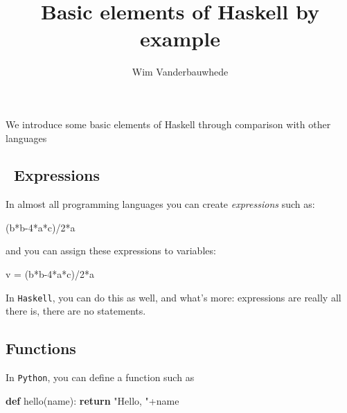 \documentclass[11pt]{amsart}
\title{Basic elements of Haskell by example }
\author{Wim Vanderbauwhede}
\newenvironment{Shaded}{}{}
\newcommand{\KeywordTok}[1]{\textcolor[rgb]{0.00,0.44,0.13}{\textbf{{#1}}}}
\newcommand{\DecValTok}[1]{\textcolor[rgb]{0.25,0.63,0.44}{{#1}}}
\newcommand{\StringTok}[1]{\textcolor[rgb]{0.25,0.44,0.63}{{#1}}}
\newcommand{\FunctionTok}[1]{\textcolor[rgb]{0.02,0.16,0.49}{{#1}}}
\newcommand{\NormalTok}[1]{{#1}}
\begin{document}
\maketitle

We introduce some basic elements of Haskell through comparison with
other languages

\subsection{~Expressions}\label{expressions}

In almost all programming languages you can create \emph{expressions}
such as:

\begin{Shaded}
\begin{Highlighting}[]
    \NormalTok{(b}\FunctionTok{*}\NormalTok{b}\FunctionTok{-}\DecValTok{4}\FunctionTok{*}\NormalTok{a}\FunctionTok{*}\NormalTok{c)}\FunctionTok{/}\DecValTok{2}\FunctionTok{*}\NormalTok{a}
\end{Highlighting}
\end{Shaded}

and you can assign these expressions to variables:

\begin{Shaded}
\begin{Highlighting}[]
    \NormalTok{v }\FunctionTok{=} \NormalTok{(b}\FunctionTok{*}\NormalTok{b}\FunctionTok{-}\DecValTok{4}\FunctionTok{*}\NormalTok{a}\FunctionTok{*}\NormalTok{c)}\FunctionTok{/}\DecValTok{2}\FunctionTok{*}\NormalTok{a}
\end{Highlighting}
\end{Shaded}

In \texttt{Haskell}, you can do this as well, and what's more:
expressions are really all there is, there are no statements.

\subsection{Functions}\label{functions}

In \texttt{Python}, you can define a function such as

\begin{Shaded}
\begin{Highlighting}[]
    \KeywordTok{def} \NormalTok{hello(name):}
        \KeywordTok{return} \StringTok{"Hello, "}\NormalTok{+name}
\end{Highlighting}
\end{Shaded}
\end{document}

